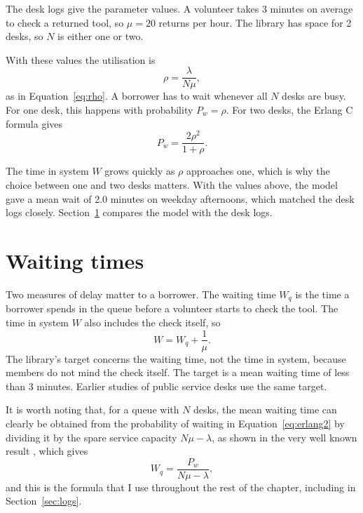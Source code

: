 The desk logs give the parameter values.
A volunteer takes 3 minutes on average to check a returned tool, so $\mu = 20$ returns per hour.
The library has space for 2 desks, so $N$ is either one or two.

With these values the utilisation is
\begin{equation}
  \rho = \frac{\lambda}{N\mu},
  \label{eq:util}
\end{equation}
as in Equation~\eqref{eq:rho}.
A borrower has to wait whenever all $N$ desks are busy.
For one desk, this happens with probability $P_w = \rho$.
For two desks, the Erlang C formula gives
\begin{equation}
  P_w = \frac{2\rho^2}{1+\rho}.
  \label{eq:erlang2}
\end{equation}

The time in system $W$ grows quickly as $\rho$ approaches one, which is why the choice between one and two desks matters.
With the values above, the model gave a mean wait of 2.0 minutes on weekday afternoons, which matched the desk logs closely.
Section~\ref{sec:waiting} compares the model with the desk logs.

\section{Waiting times}
\label{sec:waiting}

Two measures of delay matter to a borrower.
The waiting time $W_q$ is the time a borrower spends in the queue before a volunteer starts to check the tool.
The time in system $W$ also includes the check itself, so
\begin{equation}
  W = W_q + \frac{1}{\mu}.
  \label{eq:w}
\end{equation}
The library's target concerns the waiting time, not the time in system, because members do not mind the check itself.
The target is a mean waiting time of less than 3 minutes.
Earlier studies of public service desks use the same target.

It is worth noting that, for a queue with $N$ desks, the mean waiting time can clearly be obtained from the probability of waiting in Equation~\eqref{eq:erlang2} by dividing it by the spare service capacity $N\mu - \lambda$, as shown in the very well known result \cite{example2021}, which gives
\begin{equation}
  W_q = \frac{P_w}{N\mu - \lambda},
  \label{eq:wq}
\end{equation}
and this is the formula that I use throughout the rest of the chapter, including in Section~\ref{sec:logs}.

